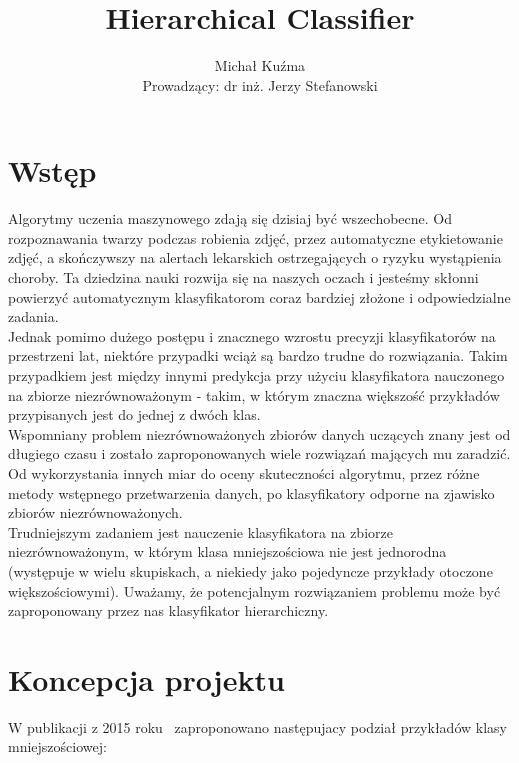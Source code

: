 \documentclass[polish,a4paper,twoside]{article}
\author{Michał Kuźma\\[1cm]{\small Prowadzący: dr inż. Jerzy Stefanowski}}
\title{Hierarchical Classifier}
\begin{document}
\pagestyle{empty}
\maketitle

\section{Wstęp}

Algorytmy uczenia maszynowego zdają się dzisiaj być wszechobecne. Od rozpoznawania twarzy podczas robienia zdjęć, przez automatyczne etykietowanie zdjęć, a skończywszy na alertach lekarskich ostrzegających o ryzyku wystąpienia choroby. Ta dziedzina nauki rozwija się na naszych oczach i jesteśmy skłonni powierzyć automatycznym klasyfikatorom coraz bardziej złożone i odpowiedzialne zadania. \\

Jednak pomimo dużego postępu i znacznego wzrostu precyzji klasyfikatorów na przestrzeni lat, niektóre przypadki wciąż są bardzo trudne do rozwiązania. Takim przypadkiem jest między innymi predykcja przy użyciu klasyfikatora nauczonego na zbiorze niezrównoważonym - takim, w którym znaczna większość przykładów przypisanych jest do jednej z dwóch klas. \\

Wspomniany problem niezrównoważonych zbiorów danych uczących znany jest od długiego czasu i zostało zaproponowanych wiele rozwiązań mających mu zaradzić. Od wykorzystania innych miar do oceny skuteczności algorytmu, przez różne metody wstępnego przetwarzenia danych, po klasyfikatory odporne na zjawisko zbiorów niezrównoważonych. \\

Trudniejszym zadaniem jest nauczenie klasyfikatora na zbiorze niezrównoważonym, w którym klasa mniejszościowa nie jest jednorodna (występuje w wielu skupiskach, a niekiedy jako pojedyncze przykłady otoczone większościowymi). Uważamy, że potencjalnym rozwiązaniem problemu może być zaproponowany przez nas klasyfikator hierarchiczny. \\

\section{Koncepcja projektu}

W publikacji z 2015 roku~\cite{minoritytypes-NapieralaStefanowski} zaproponowano następujacy podział przykładów klasy mniejszościowej:
\end{document}

